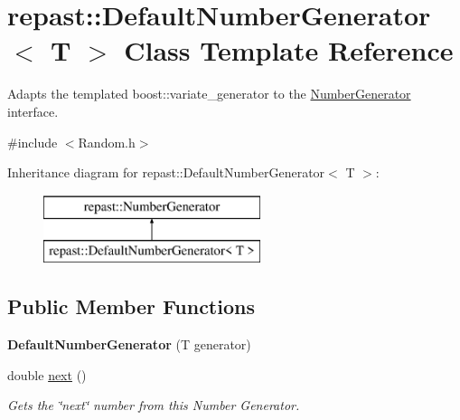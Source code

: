 \hypertarget{classrepast_1_1_default_number_generator}{\section{repast\-:\-:Default\-Number\-Generator$<$ T $>$ Class Template Reference}
\label{classrepast_1_1_default_number_generator}
}


Adapts the templated boost\-::variate\-\_\-generator to the \hyperlink{classrepast_1_1_number_generator}{Number\-Generator} interface.  




{\ttfamily \#include $<$Random.\-h$>$}

Inheritance diagram for repast\-:\-:Default\-Number\-Generator$<$ T $>$\-:\begin{figure}[H]
\begin{center}
\leavevmode
\includegraphics[height=2.000000cm]{classrepast_1_1_default_number_generator}
\end{center}
\end{figure}
\subsection*{Public Member Functions}
\begin{DoxyCompactItemize}
\item 
\hypertarget{classrepast_1_1_default_number_generator_aebb2733213c2385c065b728a57410735}{{\bfseries Default\-Number\-Generator} (T generator)}\label{classrepast_1_1_default_number_generator_aebb2733213c2385c065b728a57410735}

\item 
\hypertarget{classrepast_1_1_default_number_generator_a969fbb9ab8134ba80ff97a6c3a14062f}{double \hyperlink{classrepast_1_1_default_number_generator_a969fbb9ab8134ba80ff97a6c3a14062f}{next} ()}\label{classrepast_1_1_default_number_generator_a969fbb9ab8134ba80ff97a6c3a14062f}

\begin{DoxyCompactList}\small\item\em Gets the \char`\"{}next\char`\"{} number from this Number Generator. \end{DoxyCompactList}\end{DoxyCompactItemize}


